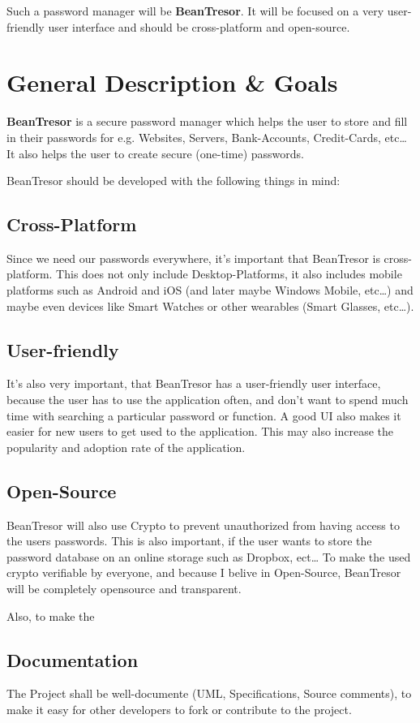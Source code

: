 \documentclass[11pt,a4paper,titlepage,portrait,english,final]{scrartcl}
\begin{document}
Such a password manager will be \textbf{BeanTresor}. It will be focused on a very user-friendly user interface and should be cross-platform and open-source.


\section{General Description \& Goals}
\textbf{BeanTresor} is a secure password manager which helps the user to store and fill in their passwords for e.g. Websites, Servers, Bank-Accounts, Credit-Cards, etc\ldots
It also helps the user to create secure (one-time) passwords.

BeanTresor should be developed with the following things in mind:

\subsection{Cross-Platform}
Since we need our passwords everywhere, it's important that BeanTresor is cross-platform. This does not only include Desktop-Platforms, it also includes mobile platforms such as Android and iOS (and later maybe Windows Mobile, etc\ldots) and maybe even devices like Smart Watches or other wearables (Smart Glasses, etc\ldots).

\subsection{User-friendly}
It's also very important,  that BeanTresor has a user-friendly user interface, because the user has to use the application often, and don't want to spend much time with searching a particular password or function. A good UI also makes it easier for new users to get used to the application. This may also increase the popularity and adoption rate of the application.

\subsection{Open-Source}
BeanTresor will also use Crypto to prevent unauthorized from having access to the users passwords. This is also important, if the user wants to store the password database on an online storage such as Dropbox, ect\ldots
To make the used crypto verifiable by everyone, and because I belive in Open-Source, BeanTresor will be completely opensource and transparent.

Also, to make the 

\subsection{Documentation}
The Project shall be well-documente (UML, Specifications, Source comments), to make it easy for other developers to fork or contribute to the project.
\end{document}
